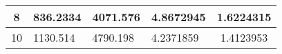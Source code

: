 \begin{table}[]
\begin{tabular}{|c|l|l|l|c|}
8                                                                                                                  & 836.2334                                                                                                                                                    & 4071.576                                                                                                                       & 4.8672945                              & 1.6224315           \\ \hline
10                                                                                                                 & 1130.514                                                                                                                                                    & 4790.198                                                                                                                       & 4.2371859                              & 1.4123953           \\ \hline
\end{tabular}
\end{table}


